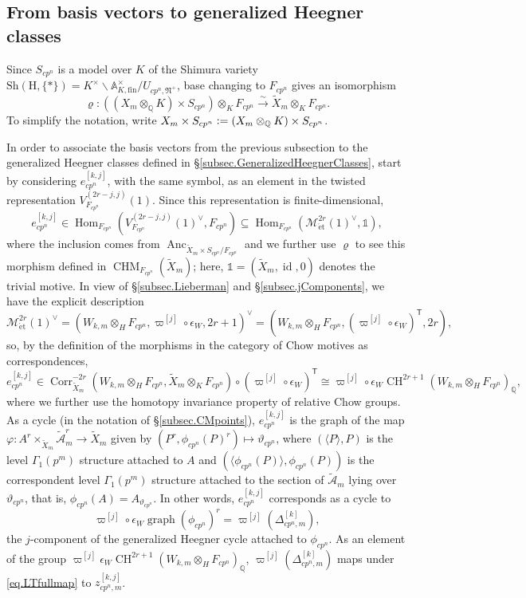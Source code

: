 \documentclass[a4paper]{amsart}
\numberwithin{equation}{section}
\theoremstyle{definition}
\newcommand{\Q}{\mathbb{Q}}
\newcommand{\A}{\mathbb{A}}
\newcommand{\defeq}{\vcentcolon=}
\DeclareMathOperator{\Hom}{Hom}
\DeclareMathOperator{\CH}{CH}
\DeclareMathOperator{\id}{id}
\DeclareMathOperator{\et}{\text{\'et}}
\DeclareMathOperator{\Corr}{Corr}
\DeclareMathOperator{\CHM}{CHM}
\DeclareMathOperator{\Anc}{Anc}
\newcommand{\Sh}{\mathrm{Sh}}
\newcommand{\boldH}{\boldsymbol{\mathrm{H}}}
\renewcommand{\et}{\mathrm{\acute{e}t}}
\begin{document}
\subsection{From basis vectors to generalized Heegner classes}\label{subsec.BasisVectorsToGHCs}
Since $S_{cp^n}$ is a model over $K$ of the Shimura variety $\Sh(\boldH,\{\ast\})=K^\times\backslash\A_{K,\mathrm{fin}}^\times/U_{cp^n,\mathfrak{N}^+}$, base changing to $F_{cp^n}$ gives an isomorphism
\begin{equation}\label{eq.Varrho}
\varrho\colon ((X_m\otimes_\Q K)\times S_{cp^n})\otimes_KF_{cp^n}\stackrel{\sim}{\longrightarrow} \widetilde{X}_m\otimes_K F_{cp^n}.
\end{equation}
To simplify the notation, write $X_m\times S_{cp^n}\defeq (X_m\otimes_\Q K)\times S_{cp^n}$.

In order to associate the basis vectors from the previous subsection to the generalized Heegner classes defined in \S\ref{subsec.GeneralizedHeegnerClasses}, start by considering $e^{[k,j]}_{cp^n}$, with the same symbol, as an element in the twisted representation $V^{(2r-j,j)}_{F_{cp^n}}(1)$. Since this representation is finite-dimensional,
\[e^{[k,j]}_{cp^n}\in\Hom_{F_{cp^n}}\left(V^{(2r-j,j)}_{F_{cp^n}}(1)^\vee,F_{cp^n}\right)\subseteq\Hom_{F_{cp^n}}\left(\mathscr{M}^{2r}_{\et}(1)^\vee,\mathds{1}\right),\] where the inclusion comes from $\Anc_{\widetilde{X}_m\times S_{cp^n}/F_{cp^n}}$ and we further use $\varrho$ to see this morphism defined in $\CHM_{F_{cp^n}}(\widetilde{X}_m)$; here, $\mathds{1}=(\widetilde{X}_m,\id,0)$ denotes the trivial motive. In view of \S\ref{subsec.Lieberman} and \S\ref{subsec.jComponents}, we have the explicit description \[\mathscr{M}_{\et}^{2r}(1)^\vee=(W_{k,m}\otimes_H F_{cp^n},\varpi^{[j]}\circ\epsilon_W,2r+1)^\vee=(W_{k,m}\otimes_H F_{cp^n},(\varpi^{[j]}\circ\epsilon_W)^\mathsf{T},2r),\] so, by the definition of the morphisms in the category of Chow motives as correspondences,
\[e_{cp^n}^{[k,j]}\in\Corr^{-2r}_{\widetilde{X}_m}(W_{k,m}\otimes_H F_{cp^n},\widetilde{X}_m\otimes_K F_{cp^n})\circ(\varpi^{[j]}\circ\epsilon_W)^\mathsf{T}\cong\varpi^{[j]}\circ\epsilon_W\CH^{2r+1}(W_{k,m}\otimes_H F_{cp^n})_{\Q},\] where we further use the homotopy invariance property of relative Chow groups. As a cycle (in the notation of \S\ref{subsec.CMpoints}), $e_{cp^n}^{[k,j]}$ is the graph of the map $\varphi\colon A^r\times_{\widetilde{X}_m}\widetilde{\mathcal{A}}_m^r\to\widetilde{X}_m$ given by $(P^r,\phi_{cp^n}(P)^r)\mapsto\vartheta_{cp^n}$, where $(\langle P\rangle,P)$ is the level $\Gamma_1(p^m)$ structure attached to $A$ and $(\langle\phi_{cp^n}(P)\rangle,\phi_{cp^n}(P))$ is the correspondent level $\Gamma_1(p^m)$ structure attached to the section of $\widetilde{\mathcal{A}}_m$ lying over $\vartheta_{cp^n}$, that is, $\phi_{cp^n}(A)=A_{\vartheta_{cp^n}}$. In other words, $e_{cp^n}^{[k,j]}$ corresponds as a cycle to \[\varpi^{[j]}\circ\epsilon_W\operatorname{graph}(\phi_{cp^n})^r=\varpi^{[j]}(\Delta_{cp^n,m}^{[k]}),\] the $j$-component of the generalized Heegner cycle attached to $\phi_{cp^n}$. As an element of the group $\varpi^{[j]}\epsilon_W\CH^{2r+1}(W_{k,m}\otimes_H F_{cp^n})_{\Q}$, $\varpi^{[j]}(\Delta_{cp^n,m}^{[k]})$ maps under \eqref{eq.LTfullmap} to $z_{cp^n,m}^{[k,j]}$.
\end{document}
